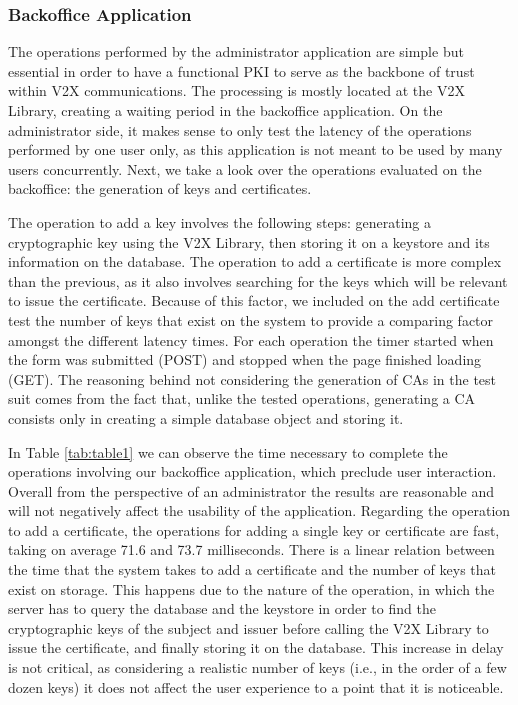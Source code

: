 \subsubsection{Backoffice Application}
The operations performed by the administrator application are simple but essential in order to have a functional PKI to serve as the backbone of trust within V2X communications. The processing is mostly located at the V2X Library, creating a waiting period in the backoffice application. On the administrator side, it makes sense to only test the latency of the operations performed by one user only, as this application is not meant to be used by many users concurrently. Next, we take a look over the operations evaluated on the backoffice: the generation of keys and certificates. 

The operation to add a key involves the following steps: generating a cryptographic key using the V2X Library, then storing it on a keystore and its information on the database. The operation to add a certificate is more complex than the previous, as it also involves searching for the keys which will be relevant to issue the certificate. Because of this factor, we included on the add certificate test the number of keys that exist on the system to provide a comparing factor amongst the different latency times. For each operation the timer started when the form was submitted (POST) and stopped when the page finished loading (GET). The reasoning behind not considering the generation of CAs in the test suit comes from the fact that, unlike the tested operations, generating a CA consists only in creating a simple database object and storing it. 


In Table \ref{tab:table1} we can observe the time necessary to complete the operations involving our backoffice application, which preclude user interaction. Overall from the perspective of an administrator the results are reasonable and will not negatively affect the usability of the application. Regarding the operation to add a certificate, the operations for adding a single key or certificate are fast, taking on average 71.6 and 73.7 milliseconds. There is a linear relation between the time that the system takes to add a certificate and the number of keys that exist on storage. This happens due to the nature of the operation, in which the server has to query the database and the keystore in order to find the cryptographic keys of the subject and issuer before calling the V2X Library to issue the certificate, and finally storing it on the database. This increase in delay is not critical, as considering a realistic number of keys (i.e., in the order of a few dozen keys) it does not affect the user experience to a point that it is noticeable.

